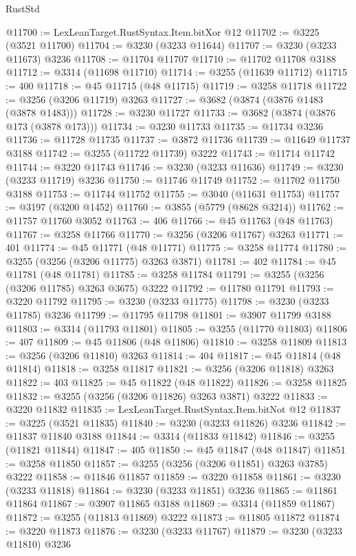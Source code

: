 \begin{lexlean}{RustStd}
\begin{coremodule}
@11700 := LexLeanTarget.RustSyntax.Item.bitXor @12
@11702 := @3225 (@3521 @11700)
@11704 := @3230 (@3233 @11644)
@11707 := @3230 (@3233 @11673) @3236
@11708 := @11704 @11707
@11710 := @11702 @11708 @3188
@11712 := @3314 (@11698 @11710)
@11714 := @3255 (@11639 @11712)
@11715 := 400
@11718 := @45 @11715 (@48 @11715)
@11719 := @3258 @11718
@11722 := @3256 (@3206 @11719) @3263
@11727 := @3682 (@3874 (@3876 @1483 (@3878 @1483)))
@11728 := @3230 @11727
@11733 := @3682 (@3874 (@3876 @173 (@3878 @173)))
@11734 := @3230 @11733
@11735 := @11734 @3236
@11736 := @11728 @11735
@11737 := @3872 @11736
@11739 := @11649 @11737 @3188
@11742 := @3255 (@11722 @11739) @3222
@11743 := @11714 @11742
@11744 := @3220 @11743
@11746 := @3230 (@3233 @11636)
@11749 := @3230 (@3233 @11719) @3236
@11750 := @11746 @11749
@11752 := @11702 @11750 @3188
@11753 := @11744 @11752
@11755 := @3040 (@11631 @11753)
@11757 := @3197 (@3200 @1452)
@11760 := @3855 (@5779 (@8628 @3214))
@11762 := @11757 @11760 @3052
@11763 := 406
@11766 := @45 @11763 (@48 @11763)
@11767 := @3258 @11766
@11770 := @3256 (@3206 @11767) @3263
@11771 := 401
@11774 := @45 @11771 (@48 @11771)
@11775 := @3258 @11774
@11780 := @3255 (@3256 (@3206 @11775) @3263 @3871)
@11781 := 402
@11784 := @45 @11781 (@48 @11781)
@11785 := @3258 @11784
@11791 := @3255 (@3256 (@3206 @11785) @3263 @3675) @3222
@11792 := @11780 @11791
@11793 := @3220 @11792
@11795 := @3230 (@3233 @11775)
@11798 := @3230 (@3233 @11785) @3236
@11799 := @11795 @11798
@11801 := @3907 @11799 @3188
@11803 := @3314 (@11793 @11801)
@11805 := @3255 (@11770 @11803)
@11806 := 407
@11809 := @45 @11806 (@48 @11806)
@11810 := @3258 @11809
@11813 := @3256 (@3206 @11810) @3263
@11814 := 404
@11817 := @45 @11814 (@48 @11814)
@11818 := @3258 @11817
@11821 := @3256 (@3206 @11818) @3263
@11822 := 403
@11825 := @45 @11822 (@48 @11822)
@11826 := @3258 @11825
@11832 := @3255 (@3256 (@3206 @11826) @3263 @3871) @3222
@11833 := @3220 @11832
@11835 := LexLeanTarget.RustSyntax.Item.bitNot @12
@11837 := @3225 (@3521 @11835)
@11840 := @3230 (@3233 @11826) @3236
@11842 := @11837 @11840 @3188
@11844 := @3314 (@11833 @11842)
@11846 := @3255 (@11821 @11844)
@11847 := 405
@11850 := @45 @11847 (@48 @11847)
@11851 := @3258 @11850
@11857 := @3255 (@3256 (@3206 @11851) @3263 @3785) @3222
@11858 := @11846 @11857
@11859 := @3220 @11858
@11861 := @3230 (@3233 @11818)
@11864 := @3230 (@3233 @11851) @3236
@11865 := @11861 @11864
@11867 := @3907 @11865 @3188
@11869 := @3314 (@11859 @11867)
@11872 := @3255 (@11813 @11869) @3222
@11873 := @11805 @11872
@11874 := @3220 @11873
@11876 := @3230 (@3233 @11767)
@11879 := @3230 (@3233 @11810) @3236

\end{coremodule}
\end{lexlean}
